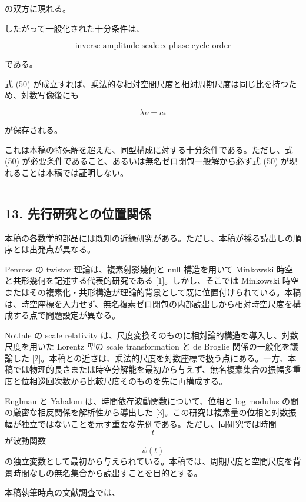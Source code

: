 \documentclass[
  a4paper,
]{ltjsarticle}
\begin{document}
の双方に現れる。

したがって一般化された十分条件は、

\[
\boxed{
\text{inverse-amplitude scale}
\ \propto\
\text{phase-cycle order}
}
\tag{50}
\]

である。

式 (50)
が成立すれば、乗法的な相対空間尺度と相対周期尺度は同じ比を持つため、対数写像後にも

\[
\lambda\nu=c_*
\]

が保存される。

これは本稿の特殊解を超えた、同型構成に対する十分条件である。ただし、式
(50) が必要条件であること、あるいは無名ゼロ閉包一般解から必ず式 (50)
が現れることは本稿では証明しない。

\begin{center}\rule{0.5\linewidth}{0.5pt}\end{center}

\subsection{13.
先行研究との位置関係}\label{ux5148ux884cux7814ux7a76ux3068ux306eux4f4dux7f6eux95a2ux4fc2}

本稿の各数学的部品には既知の近縁研究がある。ただし、本稿が採る読出しの順序とは出発点が異なる。

Penrose の twistor 理論は、複素射影幾何と null 構造を用いて Minkowski
時空と共形幾何を記述する代表的研究である {[}1{]}。しかし、そこでは
Minkowski
時空またはその複素化・共形構造が理論的背景として既に位置付けられている。本稿は、時空座標を入力せず、無名複素ゼロ閉包の内部読出しから相対時空尺度を構成する点で問題設定が異なる。

Nottale の scale relativity
は、尺度変換そのものに相対論的構造を導入し、対数尺度を用いた Lorentz
型の scale transformation と de Broglie 関係の一般化を議論した
{[}2{]}。本稿との近さは、乗法的尺度を対数座標で扱う点にある。一方、本稿では物理的長さまたは時空分解能を最初から与えず、無名複素集合の振幅多重度と位相巡回次数から比較尺度そのものを先に再構成する。

Englman と Yahalom は、時間依存波動関数について、位相と log modulus
の間の厳密な相反関係を解析性から導出した
{[}3{]}。この研究は複素量の位相と対数振幅が独立ではないことを示す重要な先例である。ただし、同研究では時間
\[t\] が波動関数 \[\psi(t)\]
の独立変数として最初から与えられている。本稿では、周期尺度と空間尺度を背景時間なしの無名集合から読出すことを目的とする。

本稿執筆時点の文献調査では、
\end{document}
